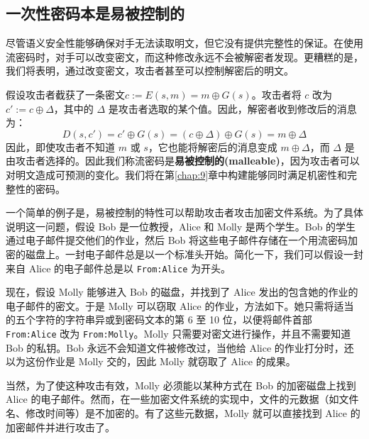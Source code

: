 \subsection{一次性密码本是易被控制的}

尽管语义安全性能够确保对手无法读取明文，但它没有提供完整性的保证。在使用流密码时，对手可以改变密文，而这种修改永远不会被解密者发现。更糟糕的是，我们将表明，通过改变密文，攻击者甚至可以控制解密后的明文。

假设攻击者截获了一条密文$c:=E(s,m)=m\oplus G(s)$。攻击者将 $c$ 改为 $c':=c\oplus\Delta$，其中的 $\Delta$ 是攻击者选取的某个值。因此，解密者收到修改后的消息为：
\[
D(s,c')=c'\oplus G(s)=(c\oplus\Delta)\oplus G(s)=m\oplus\Delta
\]
因此，即使攻击者不知道 $m$ 或 $s$，它也能将解密后的消息变成 $m\oplus\Delta$，而 $\Delta$ 是由攻击者选择的。因此我们称流密码是\textbf{易被控制的(malleable)}，因为攻击者可以对明文造成可预测的变化。我们将在第\ref{chap:9}章中构建能够同时满足机密性和完整性的密码。

一个简单的例子是，易被控制的特性可以帮助攻击者攻击加密文件系统。为了具体说明这一问题，假设 Bob 是一位教授，Alice 和 Molly 是两个学生。Bob 的学生通过电子邮件提交他们的作业，然后 Bob 将这些电子邮件存储在一个用流密码加密的磁盘上。一封电子邮件总是以一个标准头开始。简化一下，我们可以假设一封来自 Alice 的电子邮件总是以 \texttt{From:Alice} 为开头。

现在，假设 Molly 能够进入 Bob 的磁盘，并找到了 Alice 发出的包含她的作业的电子邮件的密文。于是 Molly 可以窃取 Alice 的作业，方法如下。她只需将适当的五个字符的字符串异或到密码文本的第 6 至 10 位，以便将邮件首部 \texttt{From:Alice} 改为 \texttt{From:Molly}。Molly 只需要对密文进行操作，并且不需要知道 Bob 的私钥。Bob 永远不会知道文件被修改过，当他给 Alice 的作业打分时，还以为这份作业是 Molly 交的，因此 Molly 就窃取了 Alice 的成果。

当然，为了使这种攻击有效，Molly 必须能以某种方式在 Bob 的加密磁盘上找到 Alice 的电子邮件。然而，在一些加密文件系统的实现中，文件的元数据（如文件名、修改时间等）是不加密的。有了这些元数据，Molly 就可以直接找到 Alice 的加密邮件并进行攻击了。